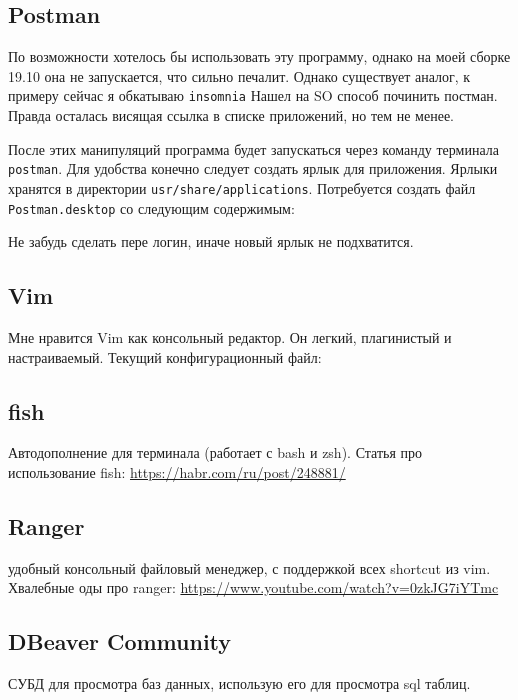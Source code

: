 \documentclass[a4paper, 12pt]{report}
\begin{document}
\subsection{Postman} По возможности хотелось бы использовать эту программу, однако на моей сборке 19.10 она не запускается, что сильно печалит. Однако существует аналог, к примеру сейчас я обкатываю \lstinline|insomnia|
Нашел на SO способ починить постман. Правда осталась висящая ссылка в списке приложений, но тем не менее.

После этих манипуляций программа будет запускаться через команду терминала \lstinline|postman|. Для удобства конечно следует создать ярлык для приложения.
Ярлыки хранятся в директории \lstinline|usr/share/applications|. Потребуется создать файл \lstinline|Postman.desktop| со следующим содержимым:

Не забудь сделать пере логин, иначе новый ярлык не подхватится.
\subsection{Vim} Мне нравится Vim как консольный редактор. Он легкий, плагинистый и настраиваемый. Текущий конфигурационный файл:

\subsection{fish} Автодополнение для терминала (работает с bash и zsh). 
Статья про использование fish: \href{https://habr.com/ru/post/248881/}{https://habr.com/ru/post/248881/}
\subsection{Ranger} удобный консольный файловый менеджер, с поддержкой всех shortcut из vim. Хвалебные оды про ranger:  \href{https://www.youtube.com/watch?v=0zkJG7iYTmc}{https://www.youtube.com/watch?v=0zkJG7iYTmc}
\subsection{DBeaver Community} СУБД для просмотра баз данных, использую его для просмотра sql таблиц.
\end{document}
